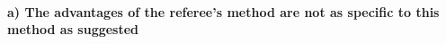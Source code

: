 \documentclass[a4paper,11pt]{article}
\begin{document}
%
%
%


\paragraph{a) The advantages of the referee's method are not as specific to this method as suggested}
\end{document}
